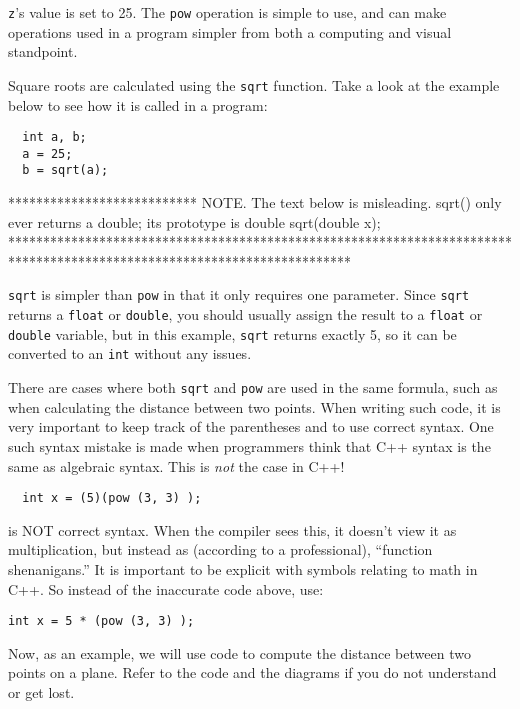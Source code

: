 	\texttt{z}'s value is set to 25. 
	The \texttt{pow} operation is simple to use, and can make operations used in a program simpler from both a computing and visual standpoint.

	Square roots are calculated using the \texttt{sqrt} function. 
	Take a look at the example below to see how it is called in a program:

\begin{lstlisting}
  int a, b;
  a = 25;
  b = sqrt(a);
\end{lstlisting}

*************************** NOTE. The text below is misleading. sqrt() only ever returns a double; its prototype is double sqrt(double x);
*************************************************************************************************************************

	\texttt{sqrt} is simpler than \texttt{pow} in that it only requires one parameter. 
	Since \texttt{sqrt} returns a \texttt{float} or \texttt{double}, you should usually assign the result to a \texttt{float} or \texttt{double} variable, but in this example, \texttt{sqrt} returns exactly 5, so it can be converted to an \texttt{int} without any issues. 
	
	There are cases where both \texttt{sqrt} and \texttt{pow} are used in the same formula, such as when calculating the distance between two points. 
	When writing such code, it is very important to keep track of the parentheses and to use correct syntax. 
	One such syntax mistake is made when programmers think that C++ syntax is the same as algebraic syntax. 
	This is \emph{not} the case in C++!

\begin{lstlisting}
  int x = (5)(pow (3, 3) );
\end{lstlisting}

is NOT correct syntax. 
When the compiler sees this, it doesn't view it as multiplication, but instead as (according to a professional), ``function shenanigans.'' 
It is important to be explicit with symbols relating to math in C++. 
So instead of the inaccurate code above, use:

\begin{lstlisting}
int x = 5 * (pow (3, 3) );
\end{lstlisting}

	Now, as an example, we will use code to compute the distance between two points on a plane.
	 Refer to the code and the diagrams if you do not understand or get lost.

